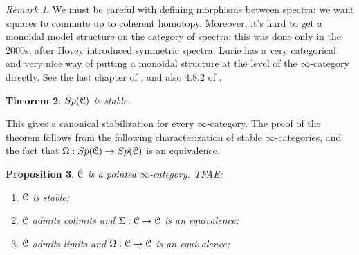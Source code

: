 \documentclass[10pt,a4paper,reqno,oneside]{book} %
\theoremstyle{plain}
\newtheorem{thm}{Theorem}[section]
\newtheorem{prop}[thm]{Proposition}
\theoremstyle{definition}
\theoremstyle{remark}
\newtheorem{rem}[thm]{Remark}
\numberwithin{equation}{section}
\begin{document}
\begin{rem}
We must be careful with defining morphisms between spectra: we want squares to commute up to coherent homotopy.
Moreover, it's hard to get a monoidal model structure on the category of spectra: this was done only in the 2000s, after Hovey 
introduced symmetric spectra. Lurie has a very categorical and very nice way of putting a monoidal structure 
at the level of the $\infty$-category
directly. See the last chapter of \cite{Groth}, and also 4.8.2 of \cite{Lurie_Higher_algebra}.
\end{rem}

\begin{thm}
$Sp(\mathcal C)$ is stable.
\end{thm}

This gives a canonical stabilization for every $\infty$-category. The proof of the theorem follows from the following characterization
of stable $\infty$-categories,
and the fact that $\Omega:Sp(\mathcal C) \to Sp(\mathcal C)$ is an equivalence.

\begin{prop}
\label{prop:stable_shift}
$\mathcal C$ is a pointed $\infty$-category. TFAE:
\begin{enumerate}
\item $\mathcal C$ is stable;
\item $\mathcal C$ admits colimits and $\Sigma : \mathcal C \to \mathcal C$ is an equivalence;
\item $\mathcal C$ admits limits and $\Omega : \mathcal C \to \mathcal C$ is an equivalence;
\end{enumerate}
\end{prop}

\end{document}
